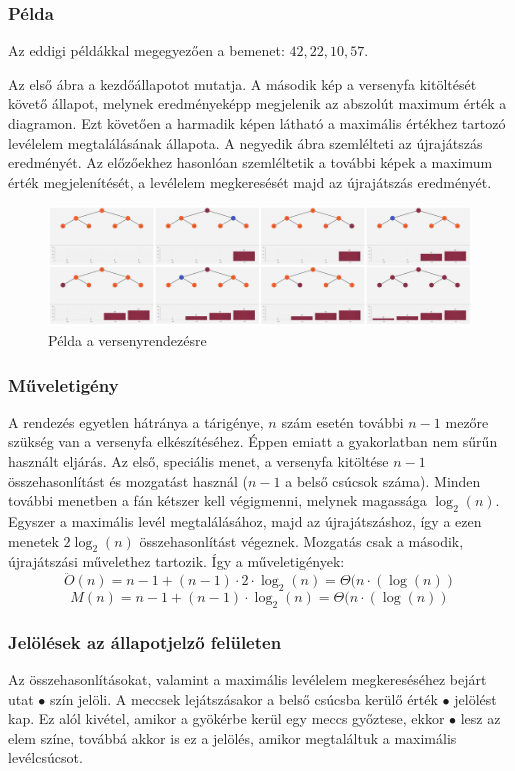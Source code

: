 \documentclass{elteikthesis}
\begin{document}
 \subsubsection{Példa}
 Az eddigi példákkal megegyezően a bemenet: $42, 22, 10, 57$.\par
 Az első ábra a kezdőállapotot mutatja. A második kép a versenyfa kitöltését követő állapot, melynek eredményeképp megjelenik az abszolút maximum érték a diagramon. Ezt követően a harmadik képen látható a maximális értékhez tartozó levélelem megtalálásának állapota. A negyedik ábra szemlélteti az újrajátszás eredményét. Az előzőekhez hasonlóan szemléltetik a további képek a maximum érték megjelenítését, a levélelem megkeresését majd az újrajátszás eredményét.\par
 \begin{figure}[H]
 	\centering
 	\includegraphics[width=1\textwidth]{pics/tournament.jpg}
 	\caption{Példa a versenyrendezésre}
 \end{figure}\par
\subsubsection{Műveletigény}
A rendezés egyetlen hátránya a tárigénye, $n$ szám esetén további $n-1$ mezőre szükség van a versenyfa elkészítéséhez. Éppen emiatt a gyakorlatban nem sűrűn használt eljárás. Az első, speciális menet, a versenyfa kitöltése $n-1$ összehasonlítást és mozgatást használ ($n-1$ a belső csúcsok száma). Minden további menetben a fán kétszer kell végigmenni, melynek magassága $\log_2(n)$. Egyszer a maximális levél megtalálásához, majd az újrajátszáshoz, így a ezen menetek $2\log_2(n)$ összehasonlítást végeznek. Mozgatás csak a második, újrajátszási művelethez tartozik. Így a műveletigények:
$$\ddot{O}(n)=n-1+(n-1)\cdot2\cdot\log_2(n)=\Theta(n\cdot(\log(n))$$
$$M(n)=n-1+(n-1)\cdot\log_2(n)=\Theta(n\cdot(\log(n))$$
\subsubsection{Jelölések az állapotjelző felületen}
Az összehasonlításokat, valamint a maximális levélelem megkereséséhez bejárt utat \textcolor{swap}{\Huge$\bullet$} szín jelöli. A meccsek lejátszásakor a belső csúcsba kerülő érték \textcolor{select}{\Huge$\bullet$} jelölést kap. Ez alól kivétel, amikor a gyökérbe kerül egy meccs győztese, ekkor \textcolor{done}{\Huge$\bullet$} lesz az elem színe, továbbá akkor is ez a jelölés, amikor megtaláltuk a maximális levélcsúcsot.
\end{document}
